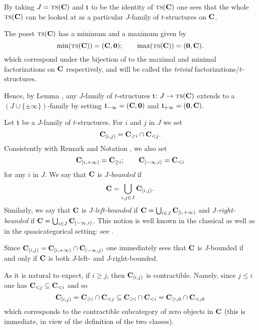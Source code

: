 \begin{example}
By taking $J=\text{\scshape ts}(\textbf{C})$ and $\mathfrak{t}$ to be the identity of $\text{\scshape ts}(\textbf{C})$ one sees that the whole $\text{\scshape ts}(\textbf{C})$ can be looked at as a particular $J$\hyp{}family of $t$\hyp{}structures on $\textbf{C}$.
\end{example}
\begin{remark}\label{infinity}
The poset $\text{\scshape ts}(\textbf{C})$ has a minimum and a maximum given by
\[
\text{min}(\text{\scshape ts}(\textbf{C}))=(\textbf{C},\mathbf{0});\qquad \text{max}(\text{\scshape ts}(\textbf{C}))=(\mathbf{0},\textbf{C}).
\]
which correspond under the bijection of \athm {} to the maximal and minimal factorizations on $\textbf{C}$ respectively, and will be called the \emph{trivial} factorizations\fshyp{}$t$\hyp{}structures. 

Hence, by Lemma , any $J$\hyp{}family of $t$\hyp{}structures $\mathfrak{t}\colon J\to \text{\scshape ts}(\textbf{C})$ extends to a $(J\cup\{\pm\infty\})$\hyp{}family by setting $\mathfrak{t}_{-\infty}=(\textbf{C},\mathbf{0})$ and $\mathfrak{t}_{+\infty}=(\mathbf{0},\textbf{C})$. 
\end{remark}
\begin{definition}\label{std.endocardium}
Let $\mathfrak{t}$ be a $J$\hyp{}family of $t$\hyp{}structures. For $i$ and $j$ in $J$ we set
\[
\textbf{C}_{[i,j)}=\textbf{C}_{\geq i}\cap \textbf{C}_{<j}.
\]
Consistently with Remark  and Notation , we also set
\[
\textbf{C}_{[i,+\infty)}=\textbf{C}_{\geq i};\qquad \textbf{C}_{[-\infty,i)}= \textbf{C}_{<i}
\]
for any $i$ in $J$. We say that $\textbf{C}$ is \emph{$J$\hyp{}bounded} if 
\[
\textbf{C}=\bigcup_{i,j\in J}\textbf{C}_{[i,j)}.
\]
Similarly, we say that $\textbf{C}$ is \emph{$J$\hyp{}left\hyp{}bounded} if $\textbf{C}=\bigcup_{i\in J}\textbf{C}_{[i,+\infty)}$ and \emph{$J$\hyp{}right\hyp{}bounded} if $\textbf{C}=\bigcup_{i\in J}\textbf{C}_{[-\infty,i)}$. This notion is well known in the classical as well as in the quasicategorical setting: see \cite{BBDPervers,LurieHA}.
\end{definition}
\begin{remark}
Since $\textbf{C}_{[i,j)}=\textbf{C}_{[i,+\infty)}\cap \textbf{C}_{[-\infty,j)}$ one immediately sees that $\textbf{C}$ is $J$\hyp{}bounded if and only if $\textbf{C}$ is both $J$\hyp{}left- and $J$\hyp{}right\hyp{}bounded.
\end{remark}
\begin{remark}
As it is natural to expect, if $i\geq j$, then $\textbf{C}_{[i,j)}$ is contractible. Namely, since $j\leq i$ one has $\textbf{C}_{<j}\subseteq \textbf{C}_{<i}$ and so 
\[
\textbf{C}_{[i,j)}=\textbf{C}_{\geq i}\cap \textbf{C}_{<j}\subseteq \textbf{C}_{\geq i}\cap \textbf{C}_{<i}=\textbf{C}_{\geq_i0}\cap \textbf{C}_{<_i0}
\]
which corresponds to the contractible subcategory of zero objects in $\textbf{C}$ (this is immediate, in view of the definition of the two classes).
\end{remark}
